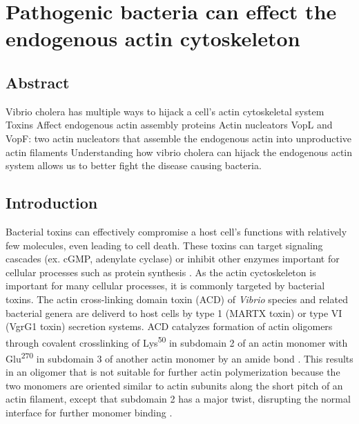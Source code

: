 \chapter{Pathogenic bacteria can effect the endogenous actin cytoskeleton}\label{ch:vibrio}

\section[Abstract]{Abstract\footnotemark}
Vibrio cholera has multiple ways to hijack a cell’s actin cytoskeletal system
Toxins
Affect endogenous actin assembly proteins
Actin nucleators
VopL and VopF: two actin nucleators that assemble the endogenous actin into unproductive actin filaments
Understanding how vibrio cholera can hijack the endogenous actin system allows us to better fight the disease causing bacteria.


\section{Introduction}\label{ch04-introduction}
Bacterial toxins can effectively compromise a host cell's functions with relatively few molecules, even leading to cell death. These toxins can target signaling cascades (ex. cGMP, adenylate cyclase) or inhibit other enzymes important for cellular processes such as protein synthesis \citep{henkel_toxins_2010}. As the actin cyctoskeleton is important for many cellular processes, it is commonly targeted by bacterial toxins. The actin cross-linking domain toxin (ACD) of \textit{Vibrio} species and related bacterial genera are deliverd to host cells by type 1 (MARTX toxin) or type VI (VgrG1 toxin) secretion systems. ACD catalyzes formation of actin oligomers through covalent crosslinking of Lys\textsuperscript{50} in subdomain 2 of an actin monomer with Glu\textsuperscript{270} in subdomain 3 of another actin monomer by an amide bond \citep{kudryashov_connecting_2008,kudryashova_glutamyl_2012}. This results in an oligomer that is not suitable for further actin polymerization because the two monomers are oriented similar to actin subunits along the short pitch of an actin filament, except that subdomain 2 has a major twist, disrupting the normal interface for further monomer binding \citep{kudryashov_connecting_2008}.  

